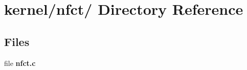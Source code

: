 \hypertarget{dir_000024}{
\section{kernel/nfct/ Directory Reference}
\label{dir_000024}
}
\subsection*{Files}
\begin{CompactItemize}
\item 
file {\bf nfct.c}
\end{CompactItemize}
